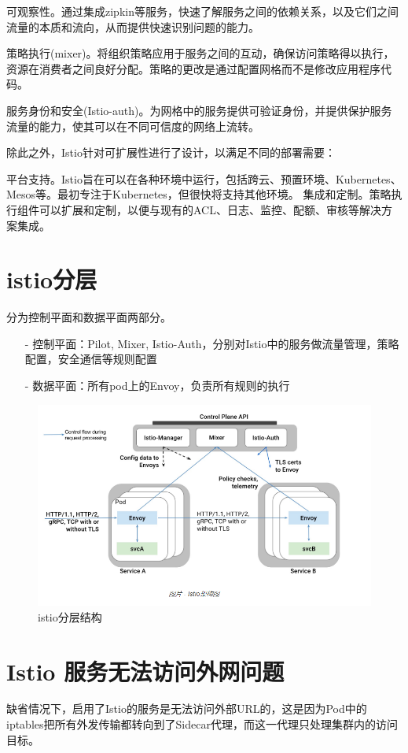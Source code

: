 \documentclass{ctexart}
\begin{document}
可观察性。通过集成zipkin等服务，快速了解服务之间的依赖关系，以及它们之间流量的本质和流向，从而提供快速识别问题的能力。

策略执行(mixer)。将组织策略应用于服务之间的互动，确保访问策略得以执行，资源在消费者之间良好分配。策略的更改是通过配置网格而不是修改应用程序代码。

服务身份和安全(Istio-auth)。为网格中的服务提供可验证身份，并提供保护服务流量的能力，使其可以在不同可信度的网络上流转。

除此之外，Istio针对可扩展性进行了设计，以满足不同的部署需要：

平台支持。Istio旨在可以在各种环境中运行，包括跨云、预置环境、Kubernetes、Mesos等。最初专注于Kubernetes，但很快将支持其他环境。
集成和定制。策略执行组件可以扩展和定制，以便与现有的ACL、日志、监控、配额、审核等解决方案集成。

\section{istio分层}
分为控制平面和数据平面两部分。 
\begin{enumerate}
	\item [-] 控制平面：Pilot, Mixer, Istio-Auth，分别对Istio中的服务做流量管理，策略配置，安全通信等规则配置 
	\item [-] 数据平面：所有pod上的Envoy，负责所有规则的执行
\end{enumerate}
\begin{figure}[H]
\includegraphics[scale=0.5]{istio/framework2.png}
\caption{istio分层结构}
\end{figure}

\section{Istio 服务无法访问外网问题}
缺省情况下，启用了Istio的服务是无法访问外部URL的，这是因为Pod中的iptables把所有外发传输都转向到了Sidecar代理，而这一代理只处理集群内的访问目标。
\end{document}

